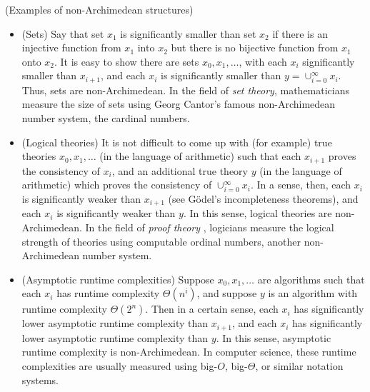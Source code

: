 \documentclass[twoside,11pt]{article}
\begin{document}
\begin{example}
\label{nonexamples}
(Examples of non-Archimedean structures)
    \begin{itemize}
        \item
        (Sets)
        Say that set $x_1$ is significantly smaller than set $x_2$ if there is an injective
        function from $x_1$ into $x_2$ but there is no bijective function from $x_1$
        onto $x_2$. It is easy to show there are sets $x_0,x_1,\ldots$, with each
        $x_{i}$ significantly smaller than $x_{i+1}$, and each $x_i$ is
        significantly smaller than
        $y=\cup_{i=0}^\infty x_i$.
        Thus, sets are
        non-Archimedean. In the field of \emph{set theory}, mathematicians measure
        the size of sets using Georg Cantor's famous non-Archimedean number system,
        the cardinal numbers.
        \item
        (Logical theories)
        It is not difficult to come up with (for example) true
        theories $x_0,x_1,\ldots$ (in the language of arithmetic) such that
        each $x_{i+1}$ proves the consistency of $x_i$, and an additional
        true theory $y$ (in the language of arithmetic)
        which proves the consistency of $\cup_{i=0}^\infty x_i$.
        In a sense, then, each $x_i$ is significantly weaker than $x_{i+1}$
        (see G\"odel's incompleteness theorems), and each $x_i$ is
        significantly weaker than $y$. In this sense, logical theories
        are non-Archimedean. In the field
        of \emph{proof theory} \citep{pohlers2008proof, rathjen},
        logicians measure the logical strength of theories using computable
        ordinal numbers, another non-Archimedean number system.
        \item
        (Asymptotic runtime complexities)
        Suppose $x_0,x_1,\ldots$ are algorithms such that each $x_i$ has
        runtime complexity $\Theta(n^i)$, and suppose $y$ is an algorithm
        with runtime complexity $\Theta(2^n)$. Then in a certain sense, each
        $x_{i}$ has significantly lower asymptotic runtime complexity than $x_{i+1}$,
        and each $x_i$ has significantly lower asymptotic runtime complexity than
        $y$. In this sense, asymptotic runtime complexity is non-Archimedean.
        In computer science, these runtime complexities are usually measured using
        big-$O$, big-$\Theta$, or similar notation systems.
    \end{itemize}
\end{example}
\end{document}
